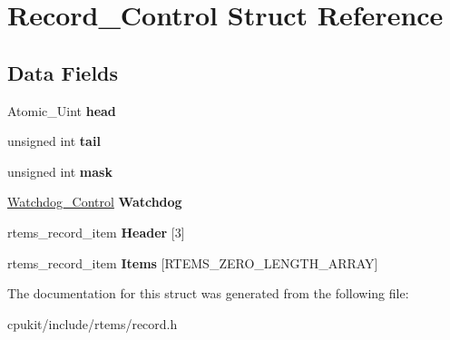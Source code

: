 \hypertarget{structRecord__Control}{}\section{Record\+\_\+\+Control Struct Reference}
\label{structRecord__Control}
\subsection*{Data Fields}
\begin{DoxyCompactItemize}
\item 
\mbox{\label{structRecord__Control_ab9695db06e4fe5300dd4272a6f451337}} 
Atomic\+\_\+\+Uint {\bfseries head}
\item 
\mbox{\label{structRecord__Control_ac0e89db3e3bd912247a352e298205fa0}} 
unsigned int {\bfseries tail}
\item 
\mbox{\label{structRecord__Control_a482c2e258121ed8f670c62e5e5afafb6}} 
unsigned int {\bfseries mask}
\item 
\mbox{\label{structRecord__Control_ab57d68bcf24f311a2aaf5c202f1e88f7}} 
\mbox{\hyperlink{structWatchdog__Control}{Watchdog\+\_\+\+Control}} {\bfseries Watchdog}
\item 
\mbox{\label{structRecord__Control_a2e4d518cae2287698ed5c71269a83856}} 
rtems\+\_\+record\+\_\+item {\bfseries Header} \mbox{[}3\mbox{]}
\item 
\mbox{\label{structRecord__Control_ada29eeae399c7a97cf21c6408f8fbb6a}} 
rtems\+\_\+record\+\_\+item {\bfseries Items} \mbox{[}R\+T\+E\+M\+S\+\_\+\+Z\+E\+R\+O\+\_\+\+L\+E\+N\+G\+T\+H\+\_\+\+A\+R\+R\+AY\mbox{]}
\end{DoxyCompactItemize}


The documentation for this struct was generated from the following file\+:\begin{DoxyCompactItemize}
\item 
cpukit/include/rtems/record.\+h\end{DoxyCompactItemize}
